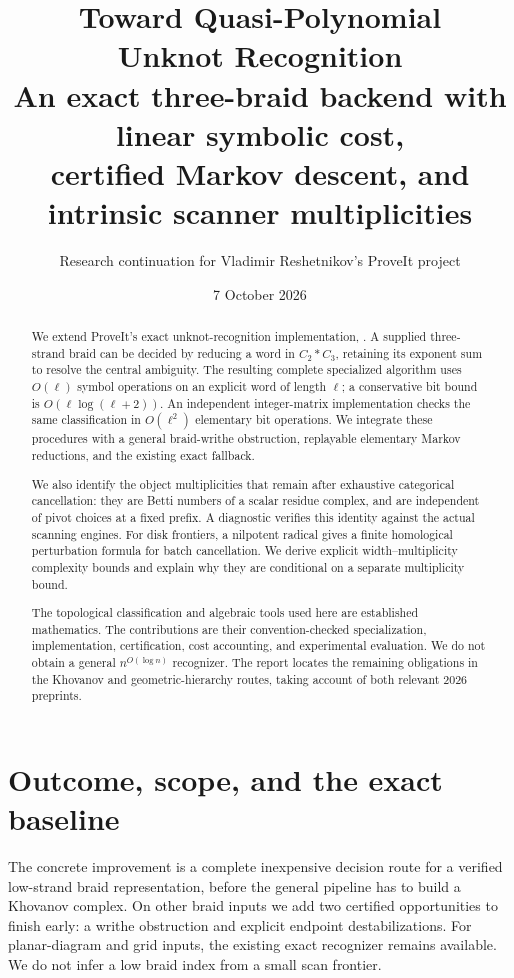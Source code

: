 \documentclass[11pt,letterpaper]{article}
\title{\color{ink}\bfseries Toward Quasi-Polynomial\\Unknot Recognition\\[5pt]
 \large An exact three-braid backend with linear symbolic cost,\\
 certified Markov descent, and intrinsic scanner multiplicities}
\author{Research continuation for Vladimir Reshetnikov's ProveIt project}
\date{7 October 2026}
\theoremstyle{definition}
\newcommand{\code}[1]{\texttt{\detokenize{#1}}}
\begin{document}
\maketitle
\begin{abstract}
We extend ProveIt's exact unknot-recognition implementation,
\code{fastunknot}.
A supplied three-strand braid can be decided by reducing a word in
\(C_2*C_3\), retaining its exponent sum to resolve the central ambiguity.
The resulting complete specialized algorithm uses \(O(\ell)\) symbol
operations on an explicit word of length \(\ell\); a conservative bit bound
is \(O(\ell\log(\ell+2))\). An independent integer-matrix implementation
checks the same classification in \(O(\ell^2)\) elementary bit operations.
We integrate these procedures with a general braid-writhe obstruction,
replayable elementary Markov reductions, and the existing exact fallback.

We also identify the object multiplicities that remain after exhaustive
categorical cancellation: they are Betti numbers of a scalar residue
complex, and are independent of pivot choices at a fixed prefix.
A diagnostic verifies this identity against the actual scanning engines.
For disk frontiers, a nilpotent radical gives a finite homological
perturbation formula for batch cancellation. We derive explicit
width--multiplicity complexity bounds and explain why they are conditional
on a separate multiplicity bound.

The topological classification and algebraic tools used here are established
mathematics. The contributions are their convention-checked specialization,
implementation, certification, cost accounting, and experimental evaluation.
We do not obtain a general \(n^{O(\log n)}\) recognizer. The report locates
the remaining obligations in the Khovanov and geometric-hierarchy routes,
taking account of both relevant 2026 preprints.
\end{abstract}
\tableofcontents
\newpage

\section{Outcome, scope, and the exact baseline}
\label{sec:scope}

The concrete improvement is a complete inexpensive decision route for a
verified low-strand braid representation, before the general pipeline has
to build a Khovanov complex. On other braid inputs we add two certified
opportunities to finish early: a writhe obstruction and explicit endpoint
destabilizations. For planar-diagram and grid inputs, the existing exact
recognizer remains available. We do not infer a low braid index from a
small scan frontier.
\end{document}

